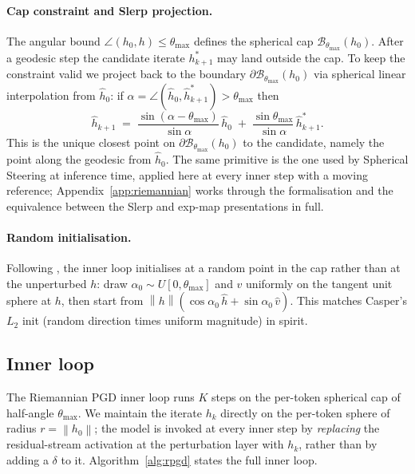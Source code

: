 \documentclass[11pt]{article}
\newcommand{\hh}{\hat h}
\newcommand{\vv}{\hat v}
\newcommand{\thmax}{\theta_{\max}}
\newcommand{\norm}[1]{\left\lVert#1\right\rVert}
\begin{document}
\paragraph{Cap constraint and Slerp projection.} The angular bound $\angle(h_0, h) \le \thmax$ defines the spherical cap $\mathcal{B}_{\thmax}(h_0)$. After a geodesic step the candidate iterate $h_{k+1}^*$ may land outside the cap. To keep the constraint valid we project back to the boundary $\partial\mathcal{B}_{\thmax}(h_0)$ via spherical linear interpolation from $\hh_0$: if $\alpha = \angle(\hh_0, \hh_{k+1}^*) > \thmax$ then
\begin{equation}
\hh_{k+1} \;=\; \frac{\sin(\alpha - \thmax)}{\sin\alpha}\,\hh_0 \;+\; \frac{\sin\thmax}{\sin\alpha}\,\hh_{k+1}^*.
\label{eq:slerp-proj}
\end{equation}
This is the unique closest point on $\partial\mathcal{B}_{\thmax}(h_0)$ to the candidate, namely the point along the geodesic from $\hh_0$. The same primitive is the one used by Spherical Steering \citep{you2026spherical} at inference time, applied here at every inner step with a moving reference; Appendix~\ref{app:riemannian} works through the formalisation and the equivalence between the Slerp and exp-map presentations in full.

\paragraph{Random initialisation.} Following \citet{casper2024lat}, the inner loop initialises at a random point in the cap rather than at the unperturbed $h$: draw $\alpha_0 \sim U[0, \thmax]$ and $\vv$ uniformly on the tangent unit sphere at $h$, then start from $\norm{h}(\cos\alpha_0\,\hh + \sin\alpha_0\,\vv)$. This matches Casper's $L_2$ init (random direction times uniform magnitude) in spirit.

\subsection{Inner loop}\label{sec:rpgd-impl}

The Riemannian PGD inner loop runs $K$ steps on the per-token spherical cap of half-angle $\thmax$. We maintain the iterate $h_k$ directly on the per-token sphere of radius $r = \norm{h_0}$; the model is invoked at every inner step by \emph{replacing} the residual-stream activation at the perturbation layer with $h_k$, rather than by adding a $\delta$ to it. Algorithm~\ref{alg:rpgd} states the full inner loop.
\end{document}
